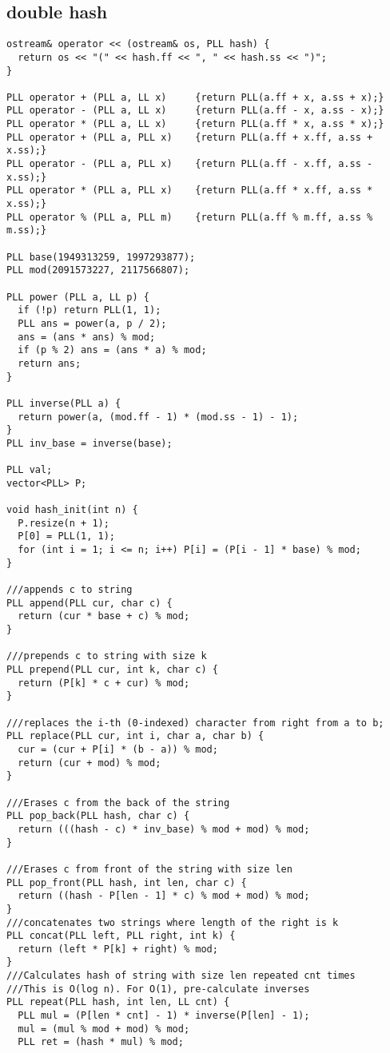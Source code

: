 \documentclass[FSZ,a4paper,onesided]{article}
\begin{document}
\begin{multicols*}{\COLS}
\subsection{double hash}
\begin{lstlisting}
ostream& operator << (ostream& os, PLL hash) {
  return os << "(" << hash.ff << ", " << hash.ss << ")";
}

PLL operator + (PLL a, LL x)     {return PLL(a.ff + x, a.ss + x);}
PLL operator - (PLL a, LL x)     {return PLL(a.ff - x, a.ss - x);}
PLL operator * (PLL a, LL x)     {return PLL(a.ff * x, a.ss * x);}
PLL operator + (PLL a, PLL x)    {return PLL(a.ff + x.ff, a.ss + x.ss);}
PLL operator - (PLL a, PLL x)    {return PLL(a.ff - x.ff, a.ss - x.ss);}
PLL operator * (PLL a, PLL x)    {return PLL(a.ff * x.ff, a.ss * x.ss);}
PLL operator % (PLL a, PLL m)    {return PLL(a.ff % m.ff, a.ss % m.ss);}

PLL base(1949313259, 1997293877);
PLL mod(2091573227, 2117566807);

PLL power (PLL a, LL p) {
  if (!p) return PLL(1, 1);
  PLL ans = power(a, p / 2);
  ans = (ans * ans) % mod;
  if (p % 2) ans = (ans * a) % mod;
  return ans;
}

PLL inverse(PLL a) {
  return power(a, (mod.ff - 1) * (mod.ss - 1) - 1);
}
PLL inv_base = inverse(base);

PLL val;
vector<PLL> P;

void hash_init(int n) {
  P.resize(n + 1);
  P[0] = PLL(1, 1);
  for (int i = 1; i <= n; i++) P[i] = (P[i - 1] * base) % mod;
}

///appends c to string
PLL append(PLL cur, char c) {
  return (cur * base + c) % mod;
}

///prepends c to string with size k
PLL prepend(PLL cur, int k, char c) {
  return (P[k] * c + cur) % mod;
}

///replaces the i-th (0-indexed) character from right from a to b;
PLL replace(PLL cur, int i, char a, char b) {
  cur = (cur + P[i] * (b - a)) % mod;
  return (cur + mod) % mod;
}

///Erases c from the back of the string
PLL pop_back(PLL hash, char c) {
  return (((hash - c) * inv_base) % mod + mod) % mod;
}

///Erases c from front of the string with size len
PLL pop_front(PLL hash, int len, char c) {
  return ((hash - P[len - 1] * c) % mod + mod) % mod;
}
///concatenates two strings where length of the right is k
PLL concat(PLL left, PLL right, int k) {
  return (left * P[k] + right) % mod;
}
///Calculates hash of string with size len repeated cnt times
///This is O(log n). For O(1), pre-calculate inverses
PLL repeat(PLL hash, int len, LL cnt) {
  PLL mul = (P[len * cnt] - 1) * inverse(P[len] - 1);
  mul = (mul % mod + mod) % mod;
  PLL ret = (hash * mul) % mod;


\end{lstlisting}
\end{multicols*}
\end{document}
